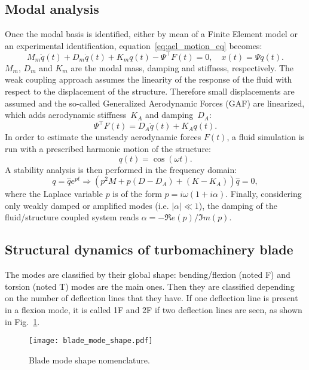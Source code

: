 \subsection{Modal analysis}
\label{sub:modal_analysis}

Once the modal basis
is identified, either by mean of a Finite
Element model or an experimental identification, 
equation~\ref{eq:ael_motion_eq} becomes:
\begin{equation}
  \label{eq:2}
  M_m \ddot{q}(t) + D_m \dot{q}(t) + K_m q (t) - \Psi^\top F(t)=0, \quad x(t) = \Psi q(t).
\end{equation}
$M_m$, $D_m$ and $K_m$ are the modal mass, 
damping and stiffness, respectively.
The weak coupling approach assumes the linearity of the response of
the fluid with respect to the displacement of the structure. Therefore
small displacements are assumed and the so-called Generalized
Aerodynamic Forces (GAF) are linearized, which adds aerodynamic
stiffness~$K_A$ and damping~$D_A$:
\begin{equation}
  \label{eq:4}
  \Psi^\top F(t) = D_A\dot{q}(t) + K_A q(t).
\end{equation}
In order to estimate the unsteady aerodynamic forces $F(t)$, 
a fluid simulation is run with a prescribed harmonic motion of the
structure:
\begin{equation}
  \label{eq:6}
  q(t)=\cos(\omega t).
\end{equation}
A stability analysis is then performed in the frequency domain:
\begin{equation}
  \label{eq:5}
  q=\hat{q}e^{p t}\Rightarrow\left(
    p^2M + p(D-D_A) + (K-K_A)
  \right)\hat{q}=0,
\end{equation}
where the Laplace variable $p$ is of the form
$p=i\omega(1+i\alpha)$. Finally, considering only weakly damped or
amplified modes (i.e. $|\alpha| \ll 1$), the damping of the
fluid/structure coupled system reads $\alpha=-\Re e(p)/\Im m(p)$.

\subsection{Structural dynamics of turbomachinery blade}
\label{sub:structural_dynamics_of_turbomachinery_blade}

The modes are classified by their global shape: 
bending/flexion (noted F) and torsion (noted T) 
modes are the main ones. Then they are classified
depending on the number of deflection lines that they
have. If one deflection line is present in a flexion 
mode, it is called 1F and 2F if two deflection lines are
seen, as shown in Fig.~\ref{fig:blade_mode_shape}.
\begin{figure}[htp]
  \centering
  \texttt{[image: blade\_mode\_shape.pdf]}
  \caption{Blade mode shape nomenclature.}
  \label{fig:blade_mode_shape}
\end{figure}


